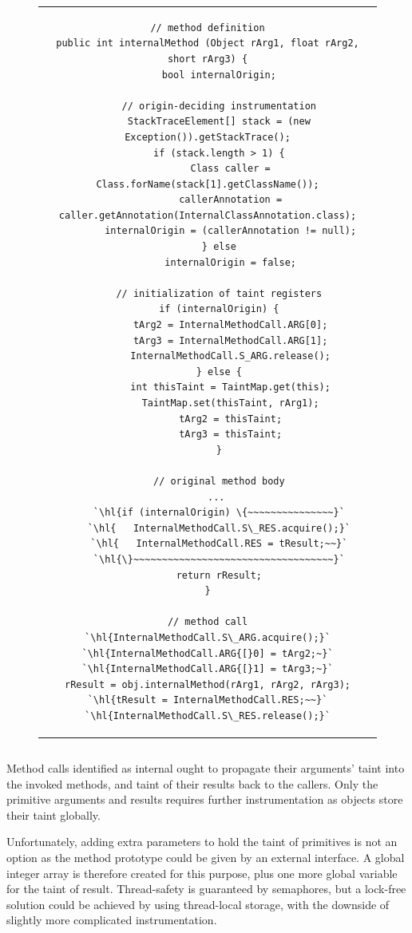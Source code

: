 \documentclass[12pt,twoside,notitlepage]{report}
\begin{document}
\begin{figure}
	\centering
	\begin{tabular}{c}
	\begin{lstlisting}
// method definition
public int internalMethod (Object rArg1, float rArg2, short rArg3) {
	bool internalOrigin;

	// origin-deciding instrumentation
	StackTraceElement[] stack = (new Exception()).getStackTrace();
	if (stack.length > 1) {
		Class caller = Class.forName(stack[1].getClassName());
		callerAnnotation = caller.getAnnotation(InternalClassAnnotation.class);
		internalOrigin = (callerAnnotation != null);
	} else
		internalOrigin = false;

	// initialization of taint registers
	if (internalOrigin) {
		tArg2 = InternalMethodCall.ARG[0];
		tArg3 = InternalMethodCall.ARG[1];
		InternalMethodCall.S_ARG.release();
	} else {
		int thisTaint = TaintMap.get(this);
		TaintMap.set(thisTaint, rArg1);
		tArg2 = thisTaint;
		tArg3 = thisTaint;
	}

	// original method body
	... 
	`\hl{if (internalOrigin) \{~~~~~~~~~~~~~~~}`
	`\hl{	InternalMethodCall.S\_RES.acquire();}`
	`\hl{	InternalMethodCall.RES = tResult;~~}`
	`\hl{\}~~~~~~~~~~~~~~~~~~~~~~~~~~~~~~~~~~~}`
	return rResult;
}

// method call
`\hl{InternalMethodCall.S\_ARG.acquire();}`
`\hl{InternalMethodCall.ARG{[}0] = tArg2;~}`
`\hl{InternalMethodCall.ARG{[}1] = tArg3;~}`
rResult = obj.internalMethod(rArg1, rArg2, rArg3);
`\hl{tResult = InternalMethodCall.RES;~~}`
`\hl{InternalMethodCall.S\_RES.release();}`
	\end{lstlisting}
	\end{tabular}
	\begin{lstlisting}[caption={Instrumentation of internal method calls and origin-deciding logic.},
	                   label={listing:TaintPropagation_InternalMethodCall}]
	\end{lstlisting}
\end{figure}

Method calls identified as internal ought to propagate their arguments' taint into the invoked methods, and taint of their results back to the callers. Only the primitive arguments and results requires further instrumentation as objects store their taint globally. 

Unfortunately, adding extra parameters to hold the taint of primitives is not an option as the method prototype could be given by an external interface. A global integer array is therefore created for this purpose, plus one more global variable for the taint of result. Thread-safety is guaranteed by semaphores, but a lock-free solution could be achieved by using thread-local storage, with the downside of slightly more complicated instrumentation.
\end{document}
